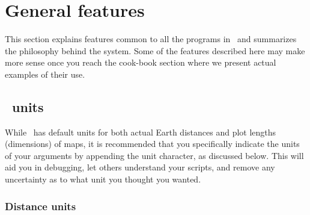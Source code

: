 %
%
\chapter{General features}
\label{ch:4}

This section explains features common to all the programs
in \GMT\ and summarizes the philosophy behind the system.  Some
of the features described here may make more sense once you reach
the cook-book section where we present actual examples of their use.

\section{\gmt\ units}

While \GMT\ has default units for both actual Earth distances and
plot lengths (dimensions) of maps, it is recommended that you specifically indicate
the units of your arguments by appending the unit character, as discussed below.
This will aid you in debugging, let others understand your scripts, and remove
any uncertainty as to what unit you thought you wanted.

\subsection{Distance units}

